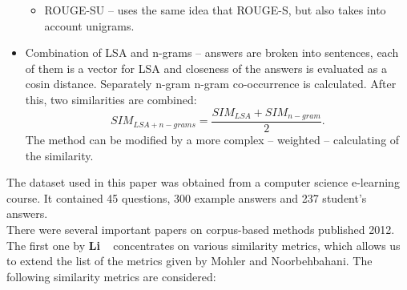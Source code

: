 \documentclass[11pt]{report}
\numberwithin{equation}{section} %
\begin{document}
\begin{itemize}
\begin{itemize}
\item ROUGE-SU -- uses the same idea that ROUGE-S, but also takes into account unigrams.
\end{itemize}
\item Combination of LSA and n-grams -- answers are broken into sentences, each of them is a vector for LSA and closeness of the answers is evaluated as a cosin distance. Separately n-gram n-gram co-occurrence is calculated. After this, two similarities are combined:\\
\begin{equation} \label{eq:LSA+n-grams}
SIM_{LSA+n-grams} = \frac{SIM_{LSA} + SIM_{n-gram}}{2}.
\end{equation}
The method can be modified by a more complex -- weighted -- calculating of the similarity.
\end{itemize}

The dataset used in this paper was obtained from a computer science e-learning course. It contained 45 questions, 300 example answers and 237 student's answers.\\

There were several important papers on corpus-based methods published 2012. The first one by \textbf{Li} ~\cite{Li} concentrates on various similarity metrics, which allows us to extend the list of the metrics given by Mohler and Noorbehbahani. The following similarity metrics are considered:
\end{document}
